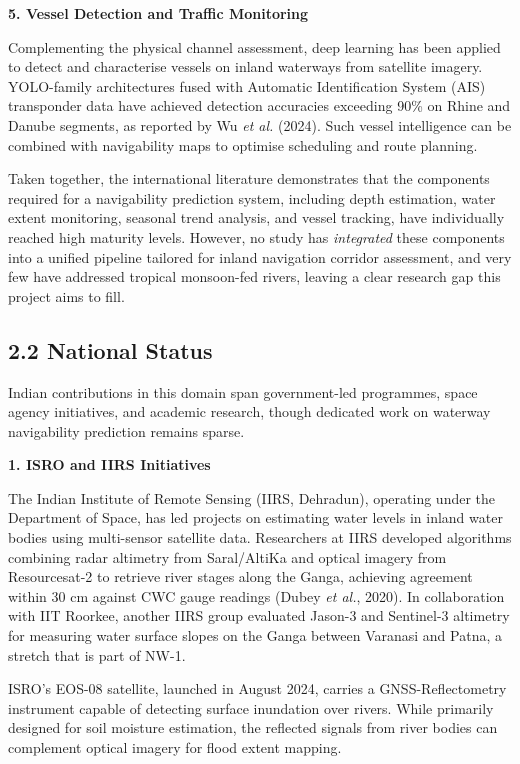 \documentclass[12pt,a4paper]{article}
\begin{document}
\textbf{5. Vessel Detection and Traffic Monitoring}

Complementing the physical channel assessment, deep learning has been applied to detect and characterise vessels on inland waterways from satellite imagery. YOLO-family architectures fused with Automatic Identification System (AIS) transponder data have achieved detection accuracies exceeding 90\% on Rhine and Danube segments, as reported by Wu \textit{et al.} (2024). Such vessel intelligence can be combined with navigability maps to optimise scheduling and route planning.

\vspace{0.3cm}
Taken together, the international literature demonstrates that the components required for a navigability prediction system, including depth estimation, water extent monitoring, seasonal trend analysis, and vessel tracking, have individually reached high maturity levels. However, no study has \textit{integrated} these components into a unified pipeline tailored for inland navigation corridor assessment, and very few have addressed tropical monsoon-fed rivers, leaving a clear research gap this project aims to fill.

\newpage
\subsection*{2.2 National Status}

Indian contributions in this domain span government-led programmes, space agency initiatives, and academic research, though dedicated work on waterway navigability prediction remains sparse.

\textbf{1. ISRO and IIRS Initiatives}

The Indian Institute of Remote Sensing (IIRS, Dehradun), operating under the Department of Space, has led projects on estimating water levels in inland water bodies using multi-sensor satellite data. Researchers at IIRS developed algorithms combining radar altimetry from Saral/AltiKa and optical imagery from Resourcesat-2 to retrieve river stages along the Ganga, achieving agreement within 30 cm against CWC gauge readings (Dubey \textit{et al.}, 2020). In collaboration with IIT Roorkee, another IIRS group evaluated Jason-3 and Sentinel-3 altimetry for measuring water surface slopes on the Ganga between Varanasi and Patna, a stretch that is part of NW-1.

ISRO's EOS-08 satellite, launched in August 2024, carries a GNSS-Reflectometry instrument capable of detecting surface inundation over rivers. While primarily designed for soil moisture estimation, the reflected signals from river bodies can complement optical imagery for flood extent mapping.
\end{document}
